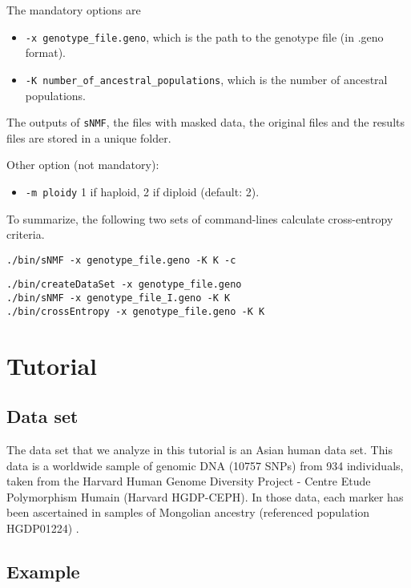 \documentclass[10pt,a4paper]{article}
\begin{document}
\begin{itemize}
The mandatory options are
\begin{itemize}
\item \verb|-x genotype_file.geno|, which is the path to the genotype file (in .geno format).
\item \verb|-K number_of_ancestral_populations|, which is the number of ancestral populations.
\end{itemize}

The outputs of {\tt sNMF}, the files with masked data, the original files and the results files 
are stored in a unique folder.

\noindent
Other option (not mandatory):
\begin{itemize}
\item \verb|-m ploidy|  1 if haploid, 2 if diploid (default: 2). 
\end{itemize}

\end{itemize}

To summarize, the following two sets of command-lines calculate cross-entropy criteria. 
\begin{Verbatim}[frame=single]
./bin/sNMF -x genotype_file.geno -K K -c
\end{Verbatim}

\begin{Verbatim}[frame=single]
./bin/createDataSet -x genotype_file.geno 
./bin/sNMF -x genotype_file_I.geno -K K
./bin/crossEntropy -x genotype_file.geno -K K
\end{Verbatim}

\section{Tutorial}

\subsection{Data set}
The data set that we analyze in this tutorial is an Asian human data set.
This data is a worldwide sample of genomic DNA (10757 SNPs) from 934 individuals,
taken from the Harvard Human Genome Diversity Project - Centre
Etude Polymorphism Humain (Harvard HGDP-CEPH). 
In those data, each marker has been ascertained in samples of Mongolian
ancestry (referenced population HGDP01224) \cite{Patterson_2012}. 

\subsection{Example}
\end{document}
